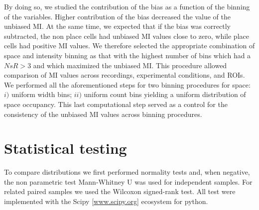 By doing so, we studied the contribution of the bias as a function of the binning of the variables.
Higher contribution of the bias decreased the value of the unbiased MI.
At the same time, we expected that if the bias was correctly subtracted, the non place cells had unbiased MI values close to zero, while place cells had positive MI values. 
We therefore selected the appropriate combination of space and intensity binning as that with the highest number of bins which had a $NsR>3$ and which maximized the unbiased MI. 
This procedure allowed comparison of MI values across recordings, experimental conditions, and ROIs. 
We performed all the aforementioned steps for two binning procedures for space: $i)$ uniform width bins; $ii)$ uniform count bins yielding a uniform distribution of space occupancy.
This last computational step served as a control for the consistency of the unbiased MI values across binning procedures. 
\section{Statistical testing}
\label{chap3:sec:8:stats}
To compare distributions we first performed normality tests and, when negative, the non parametric test Mann-Whitney U was used for independent samples. For related paired samples we used the Wilcoxon signed-rank test. 
All test were implemented with the Scipy [\url{www.scipy.org}] ecosystem for python. 

